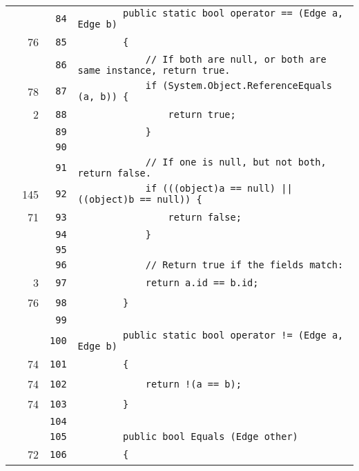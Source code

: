 \documentclass[a4paper,10pt]{article}
\begin{document}
\begin{longtable}[l]{lrrl}
\cellcolor{gray} &  & \verb~84~ & \verb~        public static bool operator == (Edge a, Edge b)~\\
\cellcolor{green} & 76 & \verb~85~ & \verb~        {~\\
\cellcolor{gray} &  & \verb~86~ & \verb~            // If both are null, or both are same instance, return true.~\\
\cellcolor{green} & 78 & \verb~87~ & \verb~            if (System.Object.ReferenceEquals (a, b)) {~\\
\cellcolor{green} & 2 & \verb~88~ & \verb~                return true;~\\
\cellcolor{gray} &  & \verb~89~ & \verb~            }~\\
\cellcolor{gray} &  & \verb~90~ & \verb~~\\
\cellcolor{gray} &  & \verb~91~ & \verb~            // If one is null, but not both, return false.~\\
\cellcolor{green} & 145 & \verb~92~ & \verb~            if (((object)a == null) || ((object)b == null)) {~\\
\cellcolor{green} & 71 & \verb~93~ & \verb~                return false;~\\
\cellcolor{gray} &  & \verb~94~ & \verb~            }~\\
\cellcolor{gray} &  & \verb~95~ & \verb~~\\
\cellcolor{gray} &  & \verb~96~ & \verb~            // Return true if the fields match:~\\
\cellcolor{green} & 3 & \verb~97~ & \verb~            return a.id == b.id;~\\
\cellcolor{green} & 76 & \verb~98~ & \verb~        }~\\
\cellcolor{gray} &  & \verb~99~ & \verb~~\\
\cellcolor{gray} &  & \verb~100~ & \verb~        public static bool operator != (Edge a, Edge b)~\\
\cellcolor{green} & 74 & \verb~101~ & \verb~        {~\\
\cellcolor{green} & 74 & \verb~102~ & \verb~            return !(a == b);~\\
\cellcolor{green} & 74 & \verb~103~ & \verb~        }~\\
\cellcolor{gray} &  & \verb~104~ & \verb~~\\
\cellcolor{gray} &  & \verb~105~ & \verb~        public bool Equals (Edge other)~\\
\cellcolor{green} & 72 & \verb~106~ & \verb~        {~\\

\end{longtable}
\end{document}

